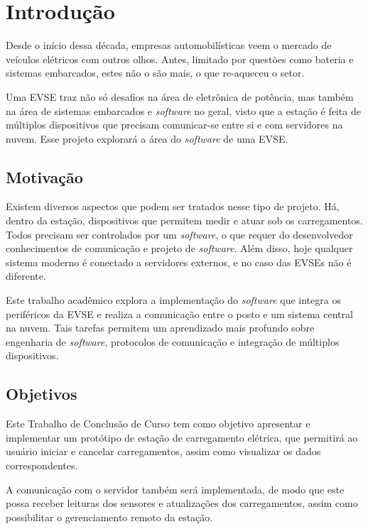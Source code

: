 \chapter{Introdução}

Desde o início dessa década, empresas automobilísticas veem o mercado de veículos elétricos com outros olhos. Antes, limitado por questões como bateria e sistemas embarcados, estes não o são mais, o que re-aqueceu o setor.

Uma \ac{EVSE} traz não só desafios na área de eletrônica de potência, mas também na área de sistemas embarcados e \textit{software} no geral, visto que a estação é feita de múltiplos dispositivos que precisam comunicar-se entre si e com servidores na nuvem. Esse projeto explorará a área do \textit{software} de uma EVSE.

\section{Motivação}

Existem diversos aspectos que podem ser tratados nesse tipo de projeto. Há, dentro da estação, dispositivos que permitem medir e atuar sob os carregamentos. Todos precisam ser controlados por um \textit{software}, o que requer do desenvolvedor conhecimentos de comunicação e projeto de \textit{software}. Além disso, hoje qualquer sistema moderno é conectado a servidores externos, e no caso das EVSEs não é diferente.

Este trabalho acadêmico explora a implementação do \textit{software} que integra os periféricos da EVSE e realiza a comunicação entre o posto e um sistema central na nuvem. Tais tarefas permitem um aprendizado mais profundo sobre engenharia de \textit{software}, protocolos de comunicação e integração de múltiplos dispositivos.

\section{Objetivos}

Este Trabalho de Conclusão de Curso tem como objetivo apresentar e implementar um protótipo de estação de carregamento elétrica, que permitirá ao usuário iniciar e cancelar carregamentos, assim como visualizar os dados correspondentes.

A comunicação com o servidor também será implementada, de modo que este possa receber leituras dos sensores e atualizações dos carregamentos, assim como possibilitar o gerenciamento remoto da estação.

